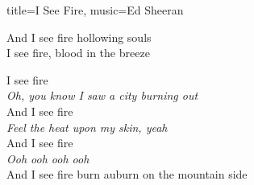 \begin{song}{title={I See Fire}, music={Ed Sheeran}}
\begin{multicols}{2}
\begin{chorus}
        And I see fire hollowing souls \\
        I see fire, blood in the breeze
    \end{chorus}
    \begin{chorus*}
        I see fire \\
        \textit{Oh, you know I saw a city burning out} \smallskip \\
        And I see fire \\
        \textit{Feel the heat upon my skin, yeah} \smallskip \\
        And I see fire \\
        \textit{Ooh ooh ooh ooh} \smallskip \\
        And I see fire burn auburn on the mountain side
    \end{chorus*}
\end{multicols}
\end{song}

